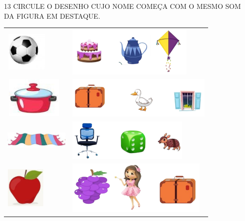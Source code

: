\num{13} CIRCULE O DESENHO CUJO NOME COMEÇA COM O MESMO SOM DA FIGURA EM DESTAQUE.

\begin{tabular}{l|l}
\includegraphics[width=0.81250in,height=0.75903in]{media/image49.jpg} & \includegraphics[width=.65\textwidth]{media/image50a.png} \\
\includegraphics[width=1.12431in,height=0.78125in]{media/image53.jpg} & \includegraphics[width=.65\textwidth]{media/image50b.png} \\
\includegraphics[width=1.22986in,height=0.61458in]{media/image57.jpg} & \includegraphics[width=.65\textwidth]{media/image50c.png} \\
\includegraphics[width=0.77569in,height=0.78125in]{media/image61.jpg} & \includegraphics[width=.65\textwidth]{media/image50d.png}
\end{tabular}

